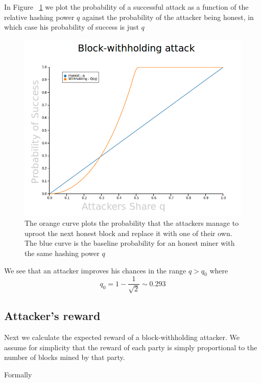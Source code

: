 \documentclass[letterpaper,12pt]{report}
\theoremstyle{plain}
\theoremstyle{definition}
\begin{document}
In Figure ~\ref{fig:PlotProbOfSuccess} we plot the probability of a successful attack as a function of the relative hashing power $q$ against the probability of the attacker being honest, in which case his probability of success is just $q$

\begin{figure}[pos]
\centering
\includegraphics[width=150mm]{Blockwithholdingattack.png}
\caption{The orange curve plots the probability that the attackers manage to uproot the next honest block and replace it with one of their own. The blue curve is the baseline probability for an honest miner with the same hashing power $q$}
\label{fig:PlotProbOfSuccess}
\end{figure}

We see that an attacker improves his chances in the range $q>q_0$ where
\begin{equation}\label{eqn:qnot}
q_0=1-\frac{1}{\sqrt{2}} \sim 0.293
\end{equation}



\newpage

\subsection{Attacker's reward}
Next we calculate the expected reward of a block-withholding attacker.
We assume for simplicity that the reward of each party is simply proportional to the number of blocks mined by that party.

Formally
\end{document}
